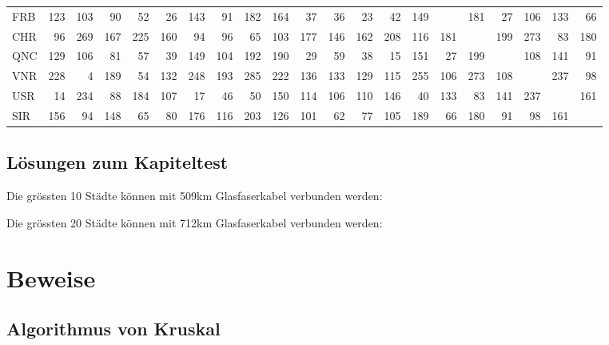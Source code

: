 \documentclass[12pt,a4paper]{report}
\theoremstyle{break}
\theoremstyle{plain}
\begin{document}
\begin{sideways}
\begin{tabular}{|l|r|r|r|r|r|r|r|r|r|r||r|r|r|r|r|r|r|r|r|r|}
FRB & 123 & 103 &  90 &  52 &  26 & 143 &  91 & 182 & 164 &  37 &  36 &  23 &  42 & 149 & & 181 &  27 & 106 & 133 &  66 \\
CHR &  96 & 269 & 167 & 225 & 160 &  94 &  96 &  65 & 103 & 177 & 146 & 162 & 208 & 116 & 181 & & 199 & 273 &  83 & 180 \\
QNC & 129 & 106 &  81 &  57 &  39 & 149 & 104 & 192 & 190 &  29 &  59 &  38 &  15 & 151 &  27 & 199 & & 108 & 141 &  91 \\
VNR & 228 &   4 & 189 &  54 & 132 & 248 & 193 & 285 & 222 & 136 & 133 & 129 & 115 & 255 & 106 & 273 & 108 & & 237 &  98 \\
USR &  14 & 234 &  88 & 184 & 107 &  17 &  46 &  50 & 150 & 114 & 106 & 110 & 146 &  40 & 133 &  83 & 141 & 237 & & 161 \\
SIR & 156 &  94 & 148 &  65 &  80 & 176 & 116 & 203 & 126 & 101 &  62 &  77 & 105 & 189 &  66 & 180 &  91 &  98 & 161 & \\
\hline\end{tabular}
\end{sideways}

\newpage
\section{L\"{o}sungen zum Kapiteltest}

Die gr\"{o}ssten 10 St\"{a}dte k\"{o}nnen mit 509km Glasfaserkabel
verbunden werden:


\newpage
Die gr\"{o}ssten 20 St\"{a}dte k\"{o}nnen mit 712km Glasfaserkabel
verbunden werden:

\begin{sideways}
\end{sideways}

\appendix

\chapter{Beweise}

\section{Algorithmus von Kruskal}
\end{document}
